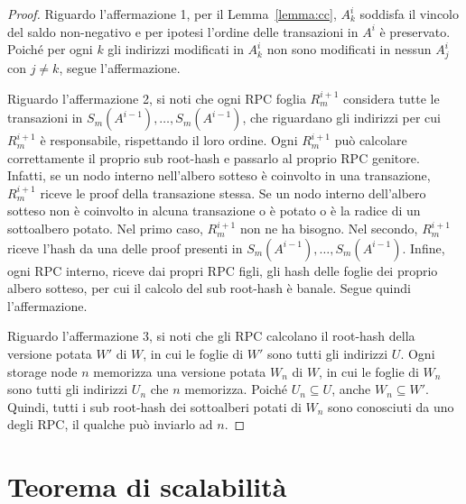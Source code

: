 \begin{proof}
Riguardo l'affermazione 1, per il Lemma~\ref{lemma:cc}, $A_k^i$ soddisfa il vincolo del saldo non-negativo e per ipotesi l'ordine delle transazioni in $A^i$ è preservato. Poiché per ogni $k$ gli indirizzi modificati in $A_k^i$ non sono modificati in nessun $A_j^i$ con $j \neq k$, segue l'affermazione.

Riguardo l'affermazione 2, si noti che ogni RPC foglia $R_m^{i+1}$ considera tutte le transazioni in $S_m(A^{i-1}), \dots, S_m(A^{i-1})$, che riguardano gli indirizzi per cui $R_m^{i+1}$ è responsabile, rispettando il loro ordine. Ogni $R_m^{i+1}$ può calcolare correttamente il proprio sub root-hash e passarlo al proprio RPC genitore. Infatti, se un nodo interno nell'albero sotteso è coinvolto in una transazione, $R_m^{i+1}$ riceve le proof della transazione stessa. Se un nodo interno dell'albero sotteso non è coinvolto in alcuna transazione o è potato o è la radice di un sottoalbero potato. Nel primo caso, $R_m^{i+1}$ non ne ha bisogno. Nel secondo, $R_m^{i+1}$ riceve l'hash da una delle proof presenti in $S_m(A^{i-1}), \dots, S_m(A^{i-1})$. Infine, ogni RPC interno, riceve dai propri RPC figli, gli hash delle foglie dei proprio albero sotteso, per cui il calcolo del sub root-hash è banale. Segue quindi l'affermazione.

Riguardo l'affermazione 3, si noti che gli RPC calcolano il root-hash della versione potata $W'$ di $W$, in cui le foglie di $W'$ sono tutti gli indirizzi $U$. Ogni storage node $n$ memorizza una versione potata $W_n$ di $W$, in cui le foglie di $W_n$ sono tutti gli indirizzi $U_n$ che $n$ memorizza. Poiché $U_n \subseteq U$, anche $W_n \subseteq W'$. Quindi, tutti i sub root-hash dei sottoalberi potati di $W_n$ sono conosciuti da uno degli RPC, il qualche può inviarlo ad $n$.
\end{proof}


\section{Teorema di scalabilità}